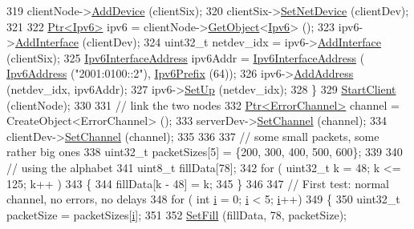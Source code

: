 \begin{DoxyCode}
319     clientNode->\hyperlink{classns3_1_1Node_a42ff83ee1d5d1649c770d3f5b62375de}{AddDevice} (clientSix);
320     clientSix->\hyperlink{classns3_1_1SixLowPanNetDevice_a81c74a5dc06e3fbad1a8b1c59d1f68fa}{SetNetDevice} (clientDev);
321 
322     \hyperlink{classns3_1_1Ptr}{Ptr<Ipv6>} ipv6 = clientNode->\hyperlink{classns3_1_1Object_a13e18c00017096c8381eb651d5bd0783}{GetObject}<\hyperlink{classns3_1_1Ipv6}{Ipv6}> ();
323     ipv6->\hyperlink{classns3_1_1Ipv6_a4fd7da82c16b8abf9ca15f982918e6a4}{AddInterface} (clientDev);
324     uint32\_t netdev\_idx = ipv6->\hyperlink{classns3_1_1Ipv6_a4fd7da82c16b8abf9ca15f982918e6a4}{AddInterface} (clientSix);
325     \hyperlink{classns3_1_1Ipv6InterfaceAddress}{Ipv6InterfaceAddress} ipv6Addr = \hyperlink{classns3_1_1Ipv6InterfaceAddress}{Ipv6InterfaceAddress} (
      \hyperlink{classns3_1_1Ipv6Address}{Ipv6Address} (\textcolor{stringliteral}{"2001:0100::2"}), \hyperlink{classns3_1_1Ipv6Prefix}{Ipv6Prefix} (64));
326     ipv6->\hyperlink{classns3_1_1Ipv6_a5cd576e83cf65445be3a0b5ffd1ddc5c}{AddAddress} (netdev\_idx, ipv6Addr);
327     ipv6->\hyperlink{classns3_1_1Ipv6_a8e61d85ec7fd342ed38fef2d040ed1b9}{SetUp} (netdev\_idx);
328   \}
329   \hyperlink{classSixlowpanFragmentationTest_a24ee0242d6fa09b786a3280b20607445}{StartClient} (clientNode);
330 
331   \textcolor{comment}{// link the two nodes}
332   \hyperlink{classns3_1_1Ptr}{Ptr<ErrorChannel>} channel = CreateObject<ErrorChannel> ();
333   serverDev->\hyperlink{classns3_1_1SimpleNetDevice_af9e9828ad584b5ba538f18f645f162e0}{SetChannel} (channel);
334   clientDev->\hyperlink{classns3_1_1SimpleNetDevice_af9e9828ad584b5ba538f18f645f162e0}{SetChannel} (channel);
335 
336 
337   \textcolor{comment}{// some small packets, some rather big ones}
338   uint32\_t packetSizes[5] = \{200, 300, 400, 500, 600\};
339 
340   \textcolor{comment}{// using the alphabet}
341   uint8\_t fillData[78];
342   \textcolor{keywordflow}{for} ( uint32\_t k = 48; k <= 125; k++ )
343     \{
344       fillData[k - 48] = k;
345     \}
346 
347   \textcolor{comment}{// First test: normal channel, no errors, no delays}
348   \textcolor{keywordflow}{for} ( \textcolor{keywordtype}{int} \hyperlink{bernuolliDistribution_8m_a6f6ccfcf58b31cb6412107d9d5281426}{i} = 0; \hyperlink{bernuolliDistribution_8m_a6f6ccfcf58b31cb6412107d9d5281426}{i} < 5; \hyperlink{bernuolliDistribution_8m_a6f6ccfcf58b31cb6412107d9d5281426}{i}++)
349     \{
350       uint32\_t packetSize = packetSizes[\hyperlink{bernuolliDistribution_8m_a6f6ccfcf58b31cb6412107d9d5281426}{i}];
351 
352       \hyperlink{classSixlowpanFragmentationTest_a6c1d0fec44562f79a8a9b78385d4d7d4}{SetFill} (fillData, 78, packetSize);

\end{DoxyCode}
